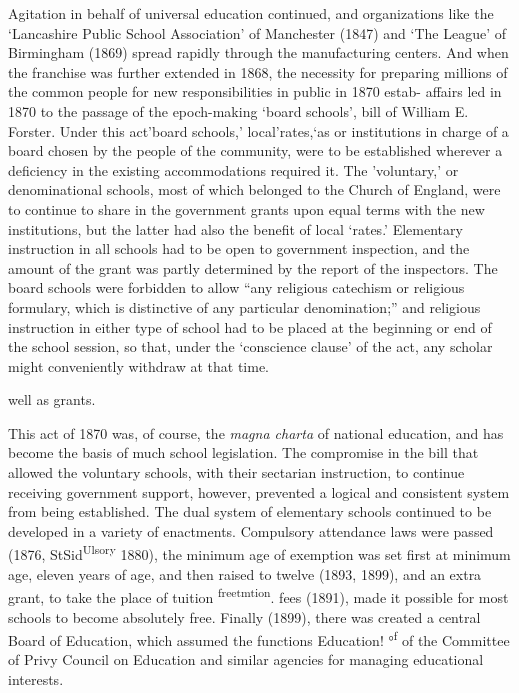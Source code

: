 \documentclass[]{book}
\begin{document}
Agitation in behalf of universal education continued, and organizations like the `Lancashire Public School Association' of Manchester (1847) and `The League' of Birmingham (1869) spread rapidly through the manufacturing centers. And when the franchise was further extended in 1868, the necessity for preparing millions of the common people for new responsibilities in public in 1870 estab- affairs led in 1870 to the passage of the epoch-making `board schools', bill of William E. Forster. Under this act'board schools,' local'rates,`as or institutions in charge of a board chosen by the people of the community, were to be established wherever a deficiency in the existing accommodations required it. The 'voluntary,' or denominational schools, most of\protect\hypertarget{ch25.xmlux5cux23para.466.1.0.box.97.242.1054.693.q.60}{}{ which belonged to the Church of England, were to continue to share in the government grants upon equal terms with the new institutions, but the latter had also the benefit of local `rates.' Elementary instruction in all schools had to be open to government inspection, and the amount of the grant was partly determined by the report of the inspectors. The board schools were forbidden to allow ``any religious catechism or religious formulary, which is distinctive of any particular denomination;'' and religious instruction in either type of school had to be placed at the beginning or end of the school session, so that, under the `conscience clause' of the act, any scholar might conveniently withdraw at that time.}

well as grants.

This act of 1870 was, of course, the \emph{magna charta} of national education, and has become the basis of much school legislation. The compromise in the bill that allowed the voluntary schools, with their sectarian instruction, to continue receiving government support, however, prevented a logical and consistent system from being established. The dual system of elementary schools continued to be developed in a variety of enactments. Compulsory attendance laws were passed (1876, StSid\textsuperscript{Ulsory} 1880), the minimum age of exemption was set first at minimum age, eleven years of age, and then raised to twelve (1893, 1899), and an extra grant, to take the place of tuition \textsuperscript{freetmtion}. fees (1891), made it possible for most schools to become absolutely free. Finally (1899), there was created a central Board of Education, which assumed the functions Education! °\textsuperscript{f} of the Committee of Privy Council on Education and similar agencies for managing educational interests.
\end{document}
